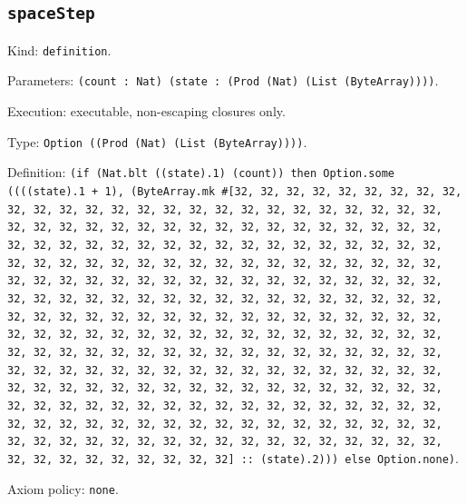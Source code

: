 \documentclass[11pt]{article}
\begin{document}
\subsection*{\texttt{spaceStep}}
\noindent Kind: \texttt{definition}.\par
\noindent Parameters: \texttt{(count : Nat) (state : (Prod (Nat) (List (ByteArray))))}.\par
\noindent Execution: executable, non-escaping closures only.\par
\noindent Type: \texttt{Option ((Prod (Nat) (List (ByteArray))))}.\par
\noindent Definition: \texttt{(if (Nat.blt ((state).1) (count)) then Option.some ((((state).1 + 1), (ByteArray.mk \#[32, 32, 32, 32, 32, 32, 32, 32, 32, 32, 32, 32, 32, 32, 32, 32, 32, 32, 32, 32, 32, 32, 32, 32, 32, 32, 32, 32, 32, 32, 32, 32, 32, 32, 32, 32, 32, 32, 32, 32, 32, 32, 32, 32, 32, 32, 32, 32, 32, 32, 32, 32, 32, 32, 32, 32, 32, 32, 32, 32, 32, 32, 32, 32, 32, 32, 32, 32, 32, 32, 32, 32, 32, 32, 32, 32, 32, 32, 32, 32, 32, 32, 32, 32, 32, 32, 32, 32, 32, 32, 32, 32, 32, 32, 32, 32, 32, 32, 32, 32, 32, 32, 32, 32, 32, 32, 32, 32, 32, 32, 32, 32, 32, 32, 32, 32, 32, 32, 32, 32, 32, 32, 32, 32, 32, 32, 32, 32, 32, 32, 32, 32, 32, 32, 32, 32, 32, 32, 32, 32, 32, 32, 32, 32, 32, 32, 32, 32, 32, 32, 32, 32, 32, 32, 32, 32, 32, 32, 32, 32, 32, 32, 32, 32, 32, 32, 32, 32, 32, 32, 32, 32, 32, 32, 32, 32, 32, 32, 32, 32, 32, 32, 32, 32, 32, 32, 32, 32, 32, 32, 32, 32, 32, 32, 32, 32, 32, 32, 32, 32, 32, 32, 32, 32, 32, 32, 32, 32, 32, 32, 32, 32, 32, 32, 32, 32, 32, 32, 32, 32, 32, 32, 32, 32, 32, 32, 32, 32, 32, 32, 32, 32, 32, 32, 32, 32, 32, 32, 32, 32, 32, 32, 32, 32, 32, 32, 32, 32, 32, 32, 32, 32, 32, 32, 32, 32] :: (state).2))) else Option.none)}.\par
\noindent Axiom policy: \texttt{none}.\par
\end{document}
